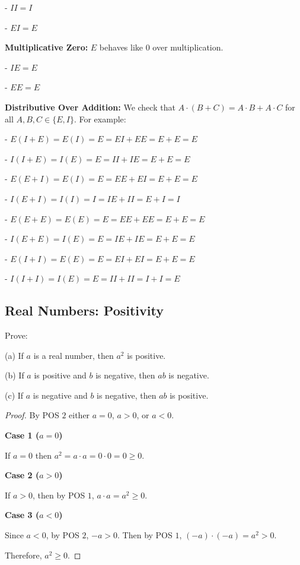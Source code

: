 - $II = I$

- $EI = E$

\textbf{Multiplicative Zero:} $E$ behaves like $0$ over multiplication.

- $IE = E$

- $EE = E$

\textbf{Distributive Over Addition:} We check that $A \cdot (B + C) = A \cdot B + A \cdot C$ for all $A, B, C \in \{E, I\}$. For example:

- $E(I + E) = E(I) = E = EI + EE = E + E = E$

- $I(I + E) = I(E) = E = II + IE = E + E = E$

- $E(E + I) = E(I) = E = EE + EI = E + E = E$

- $I(E + I) = I(I) = I = IE + II = E + I = I$

- $E(E + E) = E(E) = E = EE + EE = E + E = E$

- $I(E + E) = I(E) = E = IE + IE = E + E = E$

- $E(I + I) = E(E) = E = EI + EI = E + E = E$

- $I(I + I) = I(E) = E = II + II = I + I = E$

\subsection{Real Numbers: Positivity}

\begin{tcolorbox}[title=Problem 1, breakable]
    Prove:

    (a) If $a$ is a real number, then $a^2$ is positive.

    (b) If $a$ is positive and $b$ is negative, then $ab$ is negative.

    (c) If $a$ is negative and $b$ is negative, then $ab$ is positive.
\end{tcolorbox}

\begin{proof}
    By POS $2$ either $a = 0$, $a > 0$, or $a < 0$.

    \textbf{Case 1 ($a = 0$)}

    If $a = 0$ then $a^2 = a \cdot a = 0 \cdot 0  = 0 \ge 0$.

    \textbf{Case 2 ($a > 0$)}

    If $a > 0$, then by POS $1$, $a \cdot a = a^2 \ge 0$.

    \textbf{Case 3 ($a < 0$)}

    Since $a < 0$, by POS $2$, $-a > 0$.
    Then by POS $1$, $(-a) \cdot (-a) = a^2 > 0$.

    Therefore, $a^2 \ge 0$.
\end{proof}


